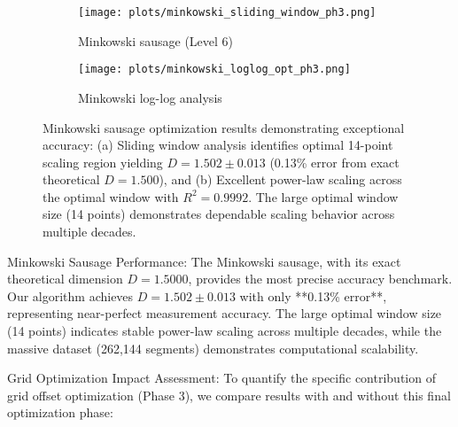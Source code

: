 \documentclass[preprint,12pt]{elsarticle}
\def\textbf#1{#1}%
\begin{document}
\begin{figure}[H]
\centering
\begin{subfigure}[b]{0.48\textwidth}
    \centering
    \texttt{[image: plots/minkowski\_sliding\_window\_ph3.png]}
    \caption{Minkowski sausage (Level 6)}
    \label{fig:minkowski_optimized}
\end{subfigure}
\hfill
\begin{subfigure}[b]{0.48\textwidth}
    \centering
    \texttt{[image: plots/minkowski\_loglog\_opt\_ph3.png]}
    \caption{Minkowski log-log analysis}
    \label{fig:minkowski_loglog}
\end{subfigure}
\caption{Minkowski sausage optimization results demonstrating exceptional accuracy: (a) Sliding window analysis identifies optimal 14-point scaling region yielding $D = 1.502 \pm 0.013$ (0.13\% error from exact theoretical $D = 1.500$), and (b) Excellent power-law scaling across the optimal window with $R^2 = 0.9992$. The large optimal window size (14 points) demonstrates dependable scaling behavior across multiple decades.}
\label{fig:minkowski_results}
\end{figure}

\textbf{Minkowski Sausage Performance}: The Minkowski sausage, with its exact theoretical dimension $D = 1.5000$, provides the most precise accuracy benchmark. Our algorithm achieves $D = 1.502 \pm 0.013$ with only **0.13\% error**, representing near-perfect measurement accuracy. The large optimal window size (14 points) indicates stable power-law scaling across multiple decades, while the massive dataset (262,144 segments) demonstrates computational scalability.

\textbf{Grid Optimization Impact Assessment}: To quantify the specific contribution of grid offset optimization (Phase 3), we compare results with and without this final optimization phase:
\end{document}
